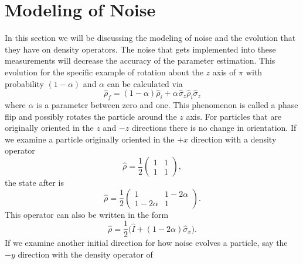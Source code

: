 \documentclass[twocolumn]{article}
\begin{document}
\section*{Modeling of Noise}
In this section we will be discussing the modeling of noise and the evolution that they have on density operators. The noise that gets implemented into these measurements will decrease the accuracy of the parameter estimation. This evolution for the specific example of rotation about the $z$ axis of $\pi$ with probability $(1-\alpha)$ and $\alpha$ can be calculated via
\begin{equation} \label{eq:83}
\hat{\rho}_f=(1-\alpha)\hat{\rho}_i+\alpha\hspace{1pt}\hat{\sigma}_z\hat{\rho}_i\hat{\sigma}_z
\end{equation}
where $\alpha$ is a parameter between zero and one. This phenomenon is called a phase flip and possibly rotates the particle around the $z$ axis. For particles that are originally oriented in the $z$ and $-z$ directions there is no change in orientation. If we examine a particle originally oriented in the $+x$ direction with a density operator 
\begin{equation} \label{eq:84}
\hat{\rho}=\frac{1}{2}
\begin{pmatrix}
1 & 1 \\
1 & 1
\end{pmatrix},
\end{equation}
the state after is
\begin{equation} \label{eq:85}
\hat{\rho}=\frac{1}{2}
\begin{pmatrix}
1 & 1-2\alpha \\
1-2\alpha & 1
\end{pmatrix}.
\end{equation}
This operator can also be written in the form
\begin{equation} \label{eq:86}
\hat{\rho}=\frac{1}{2}\big(\hat{I}+(1-2\alpha)\hat{\sigma}_x\big).
\end{equation}
If we examine another initial direction for how noise evolves a particle, say the $-y$ direction with the density operator of 
\end{document}
